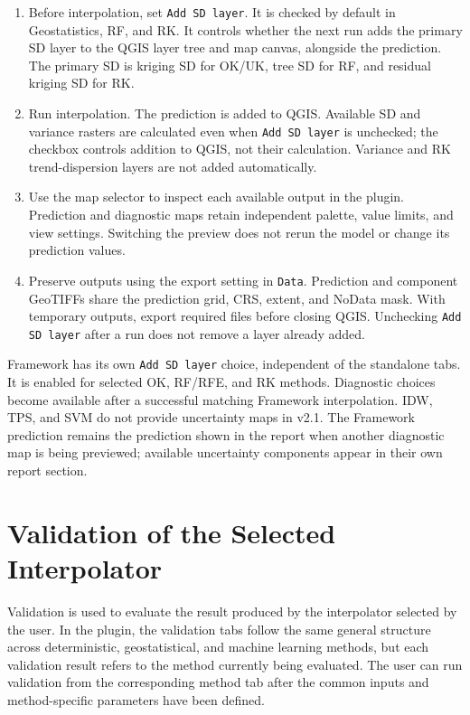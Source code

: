 \documentclass[11pt,a4paper]{article}
\begin{document}
\begin{enumerate}
    \item Before interpolation, set \texttt{Add SD layer}. It is checked by default in Geostatistics, RF, and RK. It controls whether the next run adds the primary SD layer to the QGIS layer tree and map canvas, alongside the prediction. The primary SD is kriging SD for OK/UK, tree SD for RF, and residual kriging SD for RK.
    \item Run interpolation. The prediction is added to QGIS. Available SD and variance rasters are calculated even when \texttt{Add SD layer} is unchecked; the checkbox controls addition to QGIS, not their calculation. Variance and RK trend-dispersion layers are not added automatically.
    \item Use the map selector to inspect each available output in the plugin. Prediction and diagnostic maps retain independent palette, value limits, and view settings. Switching the preview does not rerun the model or change its prediction values.
    \item Preserve outputs using the export setting in \texttt{Data}. Prediction and component GeoTIFFs share the prediction grid, CRS, extent, and NoData mask. With temporary outputs, export required files before closing QGIS. Unchecking \texttt{Add SD layer} after a run does not remove a layer already added.
\end{enumerate}

Framework has its own \texttt{Add SD layer} choice, independent of the standalone tabs. It is enabled for selected OK, RF/RFE, and RK methods. Diagnostic choices become available after a successful matching Framework interpolation. IDW, TPS, and SVM do not provide uncertainty maps in v2.1. The Framework prediction remains the prediction shown in the report when another diagnostic map is being previewed; available uncertainty components appear in their own report section.

\section{Validation of the Selected Interpolator}


Validation is used to evaluate the result produced by the interpolator selected by the user. In the plugin, the validation tabs follow the same general structure across deterministic, geostatistical, and machine learning methods, but each validation result refers to the method currently being evaluated. The user can run validation from the corresponding method tab after the common inputs and method-specific parameters have been defined.
\end{document}
